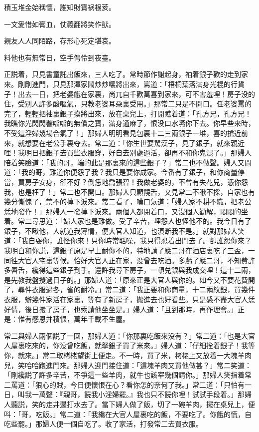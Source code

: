 \begin{myquote}
積玉堆金始稱懷，誰知財寳祸根荄。

一文愛惜如膏血，仗義翻將笑作獃。

親友人人同陌路，存形心死定堪哀。

料他也有無常日，空手俜伶到夜臺。
\end{myquote}

正説着，只見書童託出飯來，三人吃了。常時節作謝起身，袖着銀子歡的走到家來。剛剛進門，只見那渾家鬧炒炒嚷將出來，罵道：「梧桐葉落滿身光棍的行貨子！出去一日，把老婆餓在家裏，尚兀自千歡萬喜到家來，可不害羞哩！房子没的住，受别人許多酸嘔氣，只教老婆耳朶裏受用。」那常二只是不開口。任老婆罵的完了，輕輕把袖裏銀子摸將出來，放在桌兒上，打開瞧着道：「孔方兄，孔方兄！我瞧你光閃閃響噹噹的無價之寳，滿身通麻了，恨没口水嚥你下去。你早些來時，不受這淫婦幾場合氣了！」那婦人明明看見包裏十二三兩銀子一堆，喜的搶近前來，就想要在老公手裏夺去。常二道：「你生世要駡漢子，見了銀子，就來親近哩！我明日把銀子去買些衣服穿，好自去别處過活，卻再不和你鬼混了。」那婦人陪着笑臉道：「我的哥，端的此是那裏來的這些銀子？」常二也不做聲。婦人又問道：「我的哥，難道你便怨了我？我只是要你成家。今番有了銀子，和你商量停當，買房子安身，卻不好？倒恁地喬張智！我做老婆的，不曾有失花兒，憑你怨我，也是枉了！」常二也不開口。那婦人只顧饒舌，又見常二不瞅不採，自家也有幾分慚愧了，禁不的掉下淚來。常二看了，嘆口氣道：「婦人家不耕不織，把老公恁地發作！」那婦人一發掉下淚來。兩個人都閉着口，又沒個人勸解，悶悶的坐着。常二尋思道：「婦人家也是難做。受了辛苦，埋怨人也怪他不的。我今日有了銀子，不瞅他，人就道我薄情，便大官人知道，也湏断我不是。」就對那婦人笑道：「我自耍你，誰怪你來！只你時常聒噪，我只得忍着出門去了。卻誰怨你來？我明白和你説，這銀子原是早上耐你不的，特地請了應二哥在酒店裏吃了三盃，一同徃大官人宅裏等候。恰好大官人正在家，没曾去吃酒。多虧了應二哥，不知費許多唇舌，纔得這些銀子到手。還許我尋下房子，一頓兑銀與我成交哩！這十二兩，是先教我盤攪過日子的。」那婦人道：「原來正是大官人與你的。如今又不要花費開了，尋件衣服過冬，省的耐冷。」常二道：「我正要和你商量，十二兩紋銀，買幾件衣服，辦幾件家活在家裏，等有了新房子，搬進去也好看些。只是感不盡大官人恁好情，後日搬了房子，也索請他坐坐是。」婦人道：「且到那時，再作理會。」正是：惟有感恩并積恨，萬年千載不生塵。

常二與婦人兩個説了一回，那婦人道：「你那裏吃飯來没有？」常二道：「也是大官人屋裏吃來的，你没曾吃飯，就拏銀子買了米來。」婦人道：「仔細拴着銀子！我等你，就來。」常二取栲栳望街上便走。不一時，買了米，栲栳上又放着一大塊羊肉兒，笑哈哈跑進門來。那婦人迎門接住道：「這塊羊肉又買他做甚？」常二笑道：「剛纔説了許多辛苦，不爭這一些羊肉，就牛也該宰幾個請你。」那婦人笑指着常二罵道：「狠心的賊，今日便懷恨在心？看你怎的奈何了我。」常二道：「只怕有一日，叫我一萬聲：『親哥，饒我小淫婦罷。』我也只不饒你哩！試試手段着。」那婦人聽説，笑的走井邊打水去了。當下婦人做了飯，切了一碗羊肉，擺在桌兒上，便呌：「哥，吃飯。」常二道：「我纔在大官人屋裏吃的飯，不要吃了。你餓的慌，自吃些罷。」那婦人便一個自吃了。收了家活，打發常二去買衣服。

